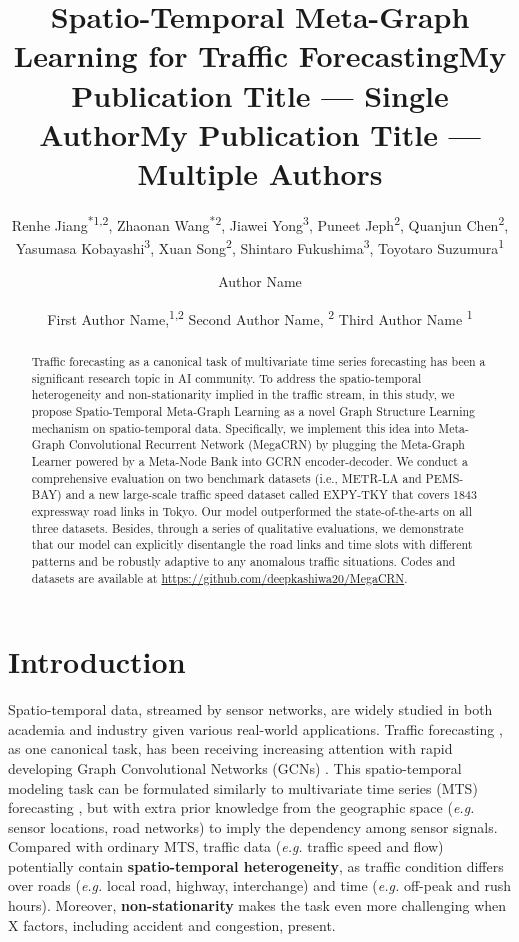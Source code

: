 \documentclass[letterpaper]{article} \usepackage{aaai23}  \usepackage{times}  \usepackage{helvet}  \usepackage{courier}  \usepackage[hyphens]{url}  \usepackage{graphicx} \urlstyle{rm} \def\UrlFont{\rm}  \usepackage{natbib}  \usepackage{caption} \usepackage{multirow}
\title{Spatio-Temporal Meta-Graph Learning for Traffic Forecasting}
\author{
Renhe Jiang\textsuperscript{*\rm 1,2},
    Zhaonan Wang\textsuperscript{*\rm 2},
    Jiawei Yong\textsuperscript{\rm 3},
    Puneet Jeph\textsuperscript{\rm 2},
    Quanjun Chen\textsuperscript{\rm 2},   \\
    Yasumasa Kobayashi\textsuperscript{\rm 3},
    Xuan Song\textsuperscript{\rm 2},
    Shintaro Fukushima\textsuperscript{\rm 3},
    Toyotaro Suzumura\textsuperscript{\rm 1}
}
\title{My Publication Title --- Single Author}
\author {
    Author Name
}
\title{My Publication Title --- Multiple Authors}
\author {
First Author Name,\textsuperscript{\rm 1,\rm 2}
    Second Author Name, \textsuperscript{\rm 2}
    Third Author Name \textsuperscript{\rm 1}
}
\begin{document}
\maketitle
{} 


\begin{abstract}
Traffic forecasting as a canonical task of multivariate time series forecasting has been a significant research topic in AI community. To address the spatio-temporal heterogeneity and non-stationarity implied in the traffic stream, in this study, we propose Spatio-Temporal Meta-Graph Learning as a novel Graph Structure Learning mechanism on spatio-temporal data. Specifically, we implement this idea into Meta-Graph Convolutional Recurrent Network (MegaCRN) by plugging the Meta-Graph Learner powered by a Meta-Node Bank into GCRN encoder-decoder. We conduct a comprehensive evaluation on two benchmark datasets (i.e., METR-LA and PEMS-BAY) and a new large-scale traffic speed dataset called EXPY-TKY that covers 1843 expressway road links in Tokyo. Our model outperformed the state-of-the-arts on all three datasets. Besides, through a series of qualitative evaluations, we demonstrate that our model can explicitly disentangle the road links and time slots with different patterns and be robustly adaptive to any anomalous traffic situations. Codes and datasets are available at \url{https://github.com/deepkashiwa20/MegaCRN}.
\end{abstract}

\section{Introduction}


Spatio-temporal data, streamed by sensor networks, are widely studied in both academia and industry given various real-world applications. Traffic forecasting \cite{yu2018spatio, li2018diffusion, zheng2020gman, bai2020adaptive, lee2021learning}, as one canonical task, has been receiving increasing attention with rapid developing Graph Convolutional Networks (GCNs) \cite{defferrard2016convolutional, kipf2016semi, velivckovic2017graph}. This spatio-temporal modeling task can be formulated similarly to multivariate time series (MTS) forecasting \cite{wu2020connecting, cao2020spectral, shang2021discrete}, but with extra prior knowledge from the geographic space (\textit{e.g.} sensor locations, road networks) to imply the dependency among sensor signals. Compared with ordinary MTS, traffic data (\textit{e.g.} traffic speed and flow) potentially contain \textbf{spatio-temporal heterogeneity}, as traffic condition differs over roads (\textit{e.g.} local road, highway, interchange) and time (\textit{e.g.} off-peak and rush hours). Moreover, \textbf{non-stationarity} makes the task even more challenging when X factors, including accident and congestion, present.
\end{document}
